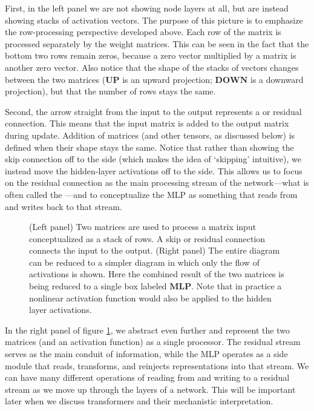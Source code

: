 First, in the left panel we are not showing node layers at all, but are instead showing stacks of activation vectors. The purpose of this picture is to emphasize the row-processing perspective developed above. Each row of the matrix is processed separately by the weight matrices. This can be seen in the fact that the bottom two rows remain zeros, because a zero vector multiplied by a matrix is another zero vector. Also notice that the shape of the stacks of vectors changes between the two matrices ($\mathbf{UP}$ is an upward projection; $\mathbf{DOWN}$ is a downward projection), but that the number of rows stays the same.  

Second, the arrow straight from the input to the output represents a  or residual connection. This means that the input matrix is added to the output matrix during update. Addition of matrices (and other tensors, as discussed below) is defined when their shape stays the same. Notice that rather than showing the skip connection off to the side (which makes the idea of ‘skipping’ intuitive), we instead move the hidden-layer activations off to the side. This allows us to focus on the residual connection as the main processing stream of the network---what is often called the ---and to conceptualize the MLP as something that reads from and writes back to that stream. 

\begin{figure}[h]
\centering
{}
\caption[Jeff Yoshimi.]{(Left panel) Two matrices are used to process a matrix input conceptualized as a stack of rows. A skip or residual connection connects the input to the output. (Right panel) The entire diagram can be reduced to a simpler diagram in which only the flow of activations is shown. Here the combined result of the two matrices is being reduced to a single box labeled  $\mathbf{MLP}$. Note that in practice a nonlinear activation function would also be applied to the hidden layer activations.}
\label{flowPerspective}
\end{figure} 

In the right panel of figure \ref{flowPerspective}, we abstract even further and represent the two matrices (and an activation function)  as a single processor. The residual stream serves as the main conduit of information, while the MLP operates as a side module that reads, transforms, and reinjects representations into that stream. We can have many different operations of reading from and writing to a residual stream as we move up through the layers of a network. This will be important later when we discuss transformers and their mechanistic interpretation.

